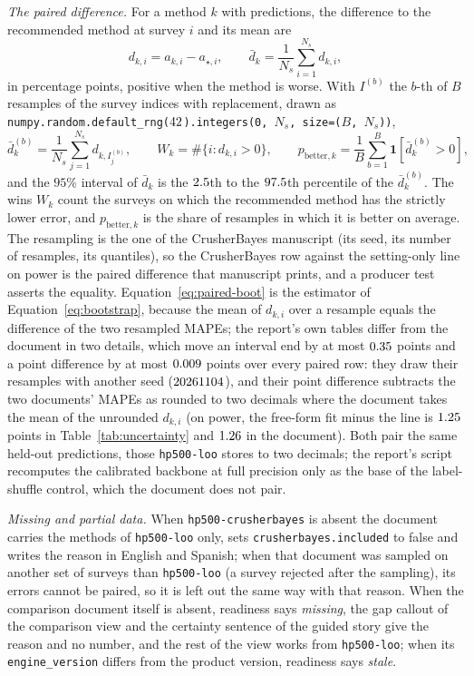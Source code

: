 \emph{The paired difference.} For a method $k$ with predictions, the difference to the recommended method at survey $i$ and its
mean are
\begin{equation}
d_{k,i} = a_{k,i} - a_{\star,i},\qquad \bar d_k = \frac{1}{N_s}\sum_{i=1}^{N_s} d_{k,i},
\label{eq:paired-d}
\end{equation}
in percentage points, positive when the method is worse. With $I^{(b)}$ the $b$-th of $B$ resamples of the survey indices with
replacement, drawn as \texttt{numpy.random.default\_rng($42$).integers(0, $N_s$, size=($B$, $N_s$))},
\begin{equation}
\bar d^{(b)}_k = \frac{1}{N_s}\sum_{j=1}^{N_s} d_{k,I^{(b)}_j},\qquad
W_k = \#\{i : d_{k,i} > 0\},\qquad
p_{\mathrm{better},k} = \frac{1}{B}\sum_{b=1}^{B}\mathbf 1\!\left[\bar d^{(b)}_k > 0\right],
\label{eq:paired-boot}
\end{equation}
and the $95\%$ interval of $\bar d_k$ is the $2.5$th to the $97.5$th percentile of the $\bar d^{(b)}_k$. The wins $W_k$
count the surveys on which the recommended method has the strictly lower error, and $p_{\mathrm{better},k}$ is the share of
resamples in which it is better on average. The resampling is the one of the CrusherBayes manuscript (its seed, its number of
resamples, its quantiles), so the CrusherBayes row against the setting-only line on power is the paired difference that
manuscript prints, and a producer test asserts the equality. Equation~\eqref{eq:paired-boot} is the estimator of
Equation~\eqref{eq:bootstrap}, because the mean of $d_{k,i}$ over a resample equals the difference of the two resampled MAPEs;
the report's own tables differ from the document in two details, which move an interval end by at most $0.35$ points
and a point difference by at most $0.009$ points over every paired row: they draw their resamples with another seed
($20261104$), and their point difference subtracts the two documents' MAPEs as rounded to two decimals where the document takes the
mean of the unrounded $d_{k,i}$ (on power, the free-form fit minus the line is $1.25$ points in Table~\ref{tab:uncertainty}
and $1.26$ in the document). Both pair the same held-out predictions, those \texttt{hp500-loo} stores to two decimals; the
report's script recomputes the calibrated backbone at full precision only as the base of the label-shuffle control, which the
document does not pair.

\emph{Missing and partial data.} When \texttt{hp500-crusherbayes} is absent the document carries the methods of
\texttt{hp500-loo} only, sets \texttt{crusherbayes.included} to false and writes the reason in English and Spanish; when that
document was sampled on another set of surveys than \texttt{hp500-loo} (a survey rejected after the sampling), its errors cannot
be paired, so it is left out the same way with that reason. When the comparison document itself is absent, readiness says
\emph{missing}, the gap callout of the comparison view and the certainty sentence of the guided story give the reason and no
number, and the rest of the view works from \texttt{hp500-loo}; when its \texttt{engine\_version} differs from the product
version, readiness says \emph{stale}.

